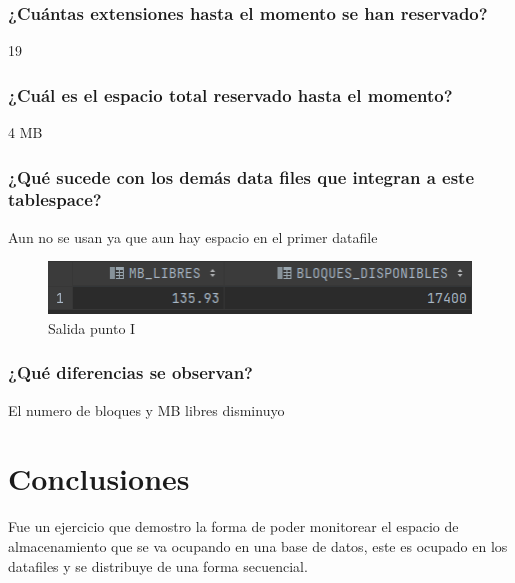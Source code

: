 \documentclass[journal]{IEEEtran}
\begin{document}
\subsubsection{¿Cuántas extensiones hasta el momento se han reservado?}
19
\subsubsection{¿Cuál es el espacio total reservado hasta el momento?}
4 MB
\subsubsection{¿Qué sucede con los demás data files que integran a este tablespace?}
Aun no se usan ya que aun hay espacio en el primer datafile
\begin{figure}[H]
  \centering
  \includegraphics[scale=.35]{captura_5.png}
   \caption{Salida punto I}
   \label{fig:validador_6}
\end{figure}
\subsubsection{¿Qué diferencias se observan?} 
El numero de bloques y MB libres disminuyo
\section{Conclusiones}
Fue un ejercicio que demostro la forma de poder monitorear el espacio de almacenamiento 
que se va ocupando en una base de datos, este es ocupado en los datafiles y se distribuye de una 
forma secuencial.
\ifCLASSOPTIONcaptionsoff
  \newpage

\fi
\end{document}
